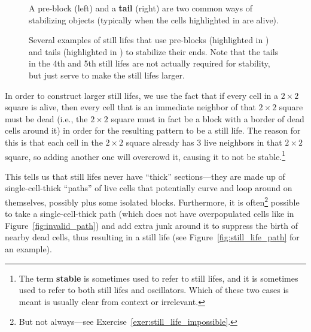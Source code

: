 \begin{figure}[!htb]
	\centering
	\begin{minipage}[b]{.31\textwidth}
		\centering
		\caption{A pre-block (left) and a \textbf{tail} (right) are two common ways of stabilizing objects (typically when the cells highlighted in  are alive).}
		\label{fig:hook_tail}
	\end{minipage} \quad %
	\begin{minipage}[b]{.64\textwidth}
		\centering
		\caption{Several examples of still lifes that use pre-blocks (highlighted in ) and tails (highlighted in ) to stabilize their ends. Note that the tails in the 4th and 5th still lifes are not actually required for stability, but just serve to make the still lifes larger.}
		\label{fig:hook_tail_examples}
	\end{minipage}
\end{figure}

In order to construct larger still lifes, we use the fact that if every cell in a $2 \times 2$ square is alive, then every cell that is an immediate neighbor of that $2 \times 2$ square must be dead (i.e., the $2 \times 2$ square must in fact be a block with a border of dead cells around it) in order for the resulting pattern to be a still life. The reason for this is that each cell in the $2 \times 2$ square already has $3$ live neighbors in that $2 \times 2$ square, so adding another one will overcrowd it, causing it to not be stable.\footnote{The term \textbf{stable} is sometimes used to refer to still lifes, and it is sometimes used to refer to both still lifes and oscillators. Which of these two cases is meant is usually clear from context or irrelevant.}

This tells us that still lifes never have ``thick'' sections---they are made up of single-cell-thick ``paths'' of live cells that potentially curve and loop around on themselves, possibly plus some isolated blocks. Furthermore, it is often\footnote{But not always---see Exercise~\ref{exer:still_life_impossible}.} possible to take a single-cell-thick path (which does not have overpopulated cells like in Figure~\ref{fig:invalid_path}) and add extra junk around it to suppress the birth of nearby dead cells, thus resulting in a still life (see Figure~\ref{fig:still_life_path} for an example).

